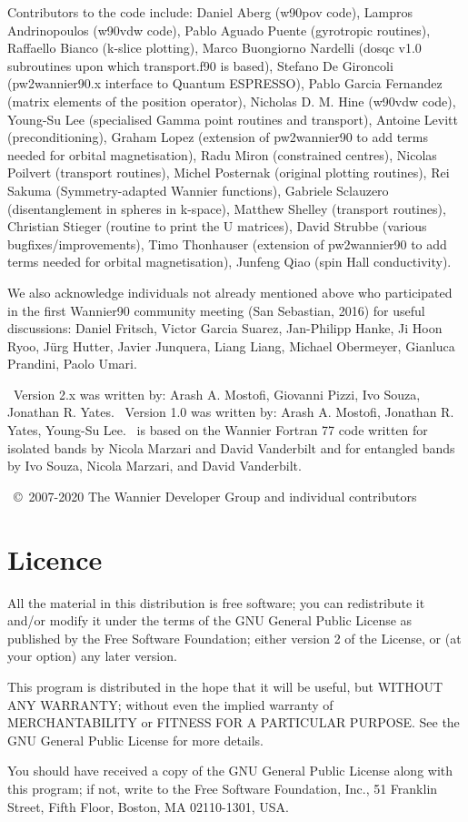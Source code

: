 Contributors to the code include:
Daniel Aberg (w90pov code), 
Lampros Andrinopoulos (w90vdw code),
Pablo Aguado Puente (gyrotropic routines),
Raffaello Bianco (k-slice plotting),
Marco Buongiorno Nardelli (dosqc v1.0 subroutines upon which transport.f90 is based),
Stefano De Gironcoli (pw2wannier90.x interface to Quantum ESPRESSO),
Pablo Garcia Fernandez (matrix elements of the position operator),
Nicholas D. M. Hine (w90vdw code),
Young-Su Lee (specialised Gamma point routines and transport),
Antoine Levitt (preconditioning),
Graham Lopez (extension of pw2wannier90 to add terms needed for orbital magnetisation),
Radu Miron (constrained centres),
Nicolas Poilvert (transport routines),
Michel Posternak (original plotting routines),
Rei Sakuma (Symmetry-adapted Wannier functions),
Gabriele Sclauzero (disentanglement in spheres in k-space),
Matthew Shelley (transport routines),
Christian Stieger (routine to print the U matrices),
David Strubbe (various bugfixes/improvements),
Timo Thonhauser (extension of pw2wannier90 to add terms needed for orbital magnetisation), Junfeng Qiao (spin Hall conductivity).

We also acknowledge individuals not already mentioned above who participated in the first Wannier90 community meeting (San Sebastian, 2016) for useful discussions:
Daniel Fritsch,
Victor Garcia Suarez,
Jan-Philipp Hanke,
Ji Hoon Ryoo,
J\"urg Hutter,
Javier Junquera,
Liang Liang,
Michael Obermeyer,
Gianluca Prandini,
Paolo Umari.

\wannier\ Version 2.x was written by:
Arash A. Mostofi, Giovanni Pizzi, Ivo Souza, Jonathan R. Yates.
\wannier\ Version 1.0 was written by:
Arash A. Mostofi, Jonathan R. Yates, Young-Su Lee.
\wannier\ is based on the Wannier Fortran 77 code written for isolated bands by Nicola Marzari
and David Vanderbilt and for entangled bands by Ivo Souza, Nicola Marzari,
and David Vanderbilt.

\wannier\ \copyright\ 2007-2020 The Wannier Developer Group and individual contributors

\section*{Licence}
All the material in this distribution is free software; you can
redistribute it and/or 
modify it under the terms of the GNU General Public License
as published by the Free Software Foundation; either version 2
of the License, or (at your option) any later version.

This program is distributed in the hope that it will be useful,
but WITHOUT ANY WARRANTY; without even the implied warranty of
MERCHANTABILITY or FITNESS FOR A PARTICULAR PURPOSE.  See the
GNU General Public License for more details.

You should have received a copy of the GNU General Public License
along with this program; if not, write to the Free Software
Foundation, Inc., 51 Franklin Street, Fifth Floor, Boston, MA  02110-1301, USA.


 
